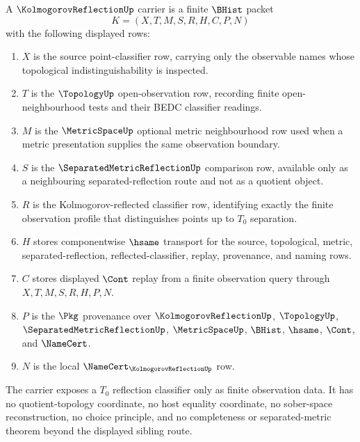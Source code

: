 \begin{definition}
\label{def:kolmogorov-reflection-carrier}
A $\KolmogorovReflectionUp$ carrier is a finite $\BHist$ packet
$$
K=(X,T,M,S,R,H,C,P,N)
$$
with the following displayed rows:
\begin{enumerate}
\item $X$ is the source point-classifier row, carrying only the observable names whose topological indistinguishability is inspected.
\item $T$ is the $\TopologyUp$ open-observation row, recording finite open-neighbourhood tests and their BEDC classifier readings.
\item $M$ is the $\MetricSpaceUp$ optional metric neighbourhood row used when a metric presentation supplies the same observation boundary.
\item $S$ is the $\SeparatedMetricReflectionUp$ comparison row, available only as a neighbouring separated-reflection route and not as a quotient object.
\item $R$ is the Kolmogorov-reflected classifier row, identifying exactly the finite observation profile that distinguishes points up to $T_0$ separation.
\item $H$ stores componentwise $\hsame$ transport for the source, topological, metric, separated-reflection, reflected-classifier, replay, provenance, and naming rows.
\item $C$ stores displayed $\Cont$ replay from a finite observation query through $X,T,M,S,R,H,P,N$.
\item $P$ is the $\Pkg$ provenance over $\KolmogorovReflectionUp$, $\TopologyUp$, $\SeparatedMetricReflectionUp$, $\MetricSpaceUp$, $\BHist$, $\hsame$, $\Cont$, and $\NameCert$.
\item $N$ is the local $\NameCert_{\KolmogorovReflectionUp}$ row.
\end{enumerate}
The carrier exposes a $T_0$ reflection classifier only as finite observation data. It has no quotient-topology coordinate, no host equality coordinate, no sober-space reconstruction, no choice principle, and no completeness or separated-metric theorem beyond the displayed sibling route.
\end{definition}

